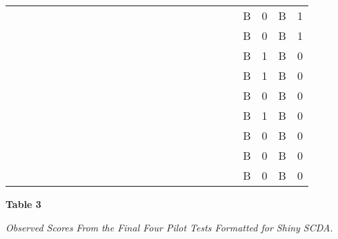 \documentclass{article}
\begin{document}
\begin{table}
\begin{tabular}{c  c  c  c  c  c  c  c  c  c  c  c  c  c  c  c  c  c}
  &   &   &   &   &   &   &   &   &   &   &   &   &   & B & 0 & B & 1\\
  &   &   &   &   &   &   &   &   &   &   &   &   &   & B & 0 & B & 1\\
  &   &   &   &   &   &   &   &   &   &   &   &   &   & B & 1 & B & 0\\
  &   &   &   &   &   &   &   &   &   &   &   &   &   & B & 1 & B & 0\\
  &   &   &   &   &   &   &   &   &   &   &   &   &   & B & 0 & B & 0\\
  &   &   &   &   &   &   &   &   &   &   &   &   &   & B & 1 & B & 0\\
  &   &   &   &   &   &   &   &   &   &   &   &   &   & B & 0 & B & 0\\
  &   &   &   &   &   &   &   &   &   &   &   &   &   & B & 0 & B & 0\\
  &   &   &   &   &   &   &   &   &   &   &   &   &   & B & 0 & B & 0\\


\end{tabular}


\end{table}


\textbf{Table 3}

\emph{Observed Scores }\emph{From}\emph{ the Final Four Pilot Tests Formatted for Shiny SCDA.}
\end{document}

